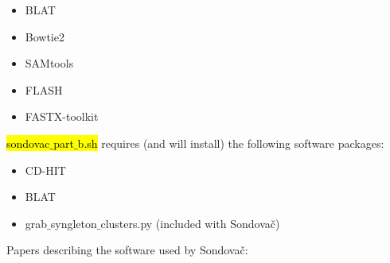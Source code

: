 \documentclass[a4paper, 11pt, twoside]{article}
\renewcommand{\texttt}[1]{\hl{\ttfamily #1}}
\begin{document}
\begin{itemize}
  \item BLAT
  \item Bowtie2
  \item SAMtools
  \item FLASH
  \item FASTX-toolkit
\end{itemize}

\texttt{sondovac$\_$part$\_$b.sh} requires (and will install) the following software packages:

\begin{itemize}
  \item CD-HIT
  \item BLAT
  \item grab$\_$syngleton$\_$clusters.py (included with Sondovač)
\end{itemize}

Papers describing the software used by Sondovač:
\end{document}
